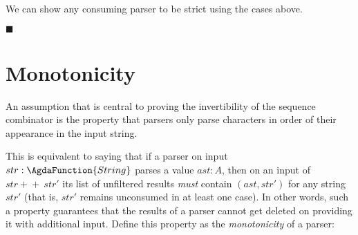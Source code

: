 \documentclass[12pt,a4paper,twoside,openright]{report}
\newcommand{\F}{\AgdaFunction}
\begin{document}
\begin{code}
\> \>[18]\AgdaSymbol{:} \>[20] \<%
\\
\> \>[18]\AgdaSymbol{:} \>[20] \<%
\\
\> \>[18]\AgdaSymbol{:} 
\>[20]  \>[40]     \AgdaSymbol{(}  \AgdaSymbol{)}\<%
\\
\> \>[18]\AgdaSymbol{:}
\>[20]  \>[40]  \AgdaSymbol{(}  \AgdaSymbol{)}\<%
\\
\> \>[18]\AgdaSymbol{:}
\>[20]  \>[40]     \AgdaSymbol{(}  \AgdaSymbol{)}\<%
\\
\> \>[18]\AgdaSymbol{:} \>[20]  \>[40]  \AgdaSymbol{(} \AgdaSymbol{)}\<%
\end{code}

We can show any consuming parser to be strict using the cases above.

\hfill{$\blacksquare$}

\section{Monotonicity} \label{mon}
An assumption that is central to proving the invertibility of the sequence combinator is the property that parsers only parse characters in order of their appearance in the input string. 

This is equivalent to saying that if a parser on input ${str} : \F{String}$ parses a value ${ast} : {A}$, then on an input of ${str +\!\!+\  str'}$ its list of unfiltered results \emph{must} contain {$(ast , str')$} for any string {$str'$} (that is, {$str'$} remains unconsumed in at least one case). In other words, such a property guarantees that the results of a parser cannot get deleted on providing it with additional input. Define this property as the \emph{monotonicity} of a parser:
\end{document}
